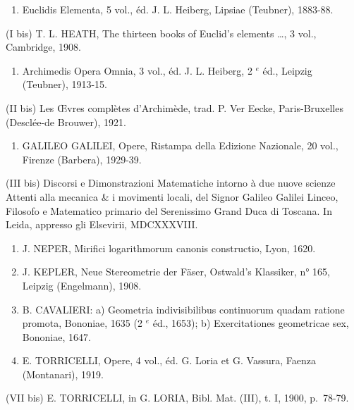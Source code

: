 \begin{enumerate}
\def\labelenumi{(\Roman{enumi})}
\tightlist
\item
  Euclidis Elementa, 5 vol., éd. J. L. Heiberg, Lipsiae (Teubner), 1883-88.
\end{enumerate}

(I bis) T. L. HEATH, The thirteen books of Euclid's elements \ldots, 3 vol., Cambridge, 1908.

\begin{enumerate}
\def\labelenumi{(\Roman{enumi})}
\setcounter{enumi}{1}
\tightlist
\item
  Archimedis Opera Omnia, 3 vol., éd. J. L. Heiberg, 2 \(^{e}\) éd., Leipzig (Teubner), 1913-15.
\end{enumerate}

(II bis) Les Œvres complètes d'Archimède, trad. P. Ver Eecke, Paris-Bruxelles (Desclée-de Brouwer), 1921.

\begin{enumerate}
\def\labelenumi{(\Roman{enumi})}
\setcounter{enumi}{2}
\tightlist
\item
  GALILEO GALILEI, Opere, Ristampa della Edizione Nazionale, 20 vol., Firenze (Barbera), 1929-39.
\end{enumerate}

(III bis) Discorsi e Dimonstrazioni Matematiche intorno à due nuove scienze Attenti alla mecanica \& i movimenti locali, del Signor Galileo Galilei Linceo, Filosofo e Matematico primario del Serenissimo Grand Duca di Toscana. In Leida, appresso gli Elsevirii, MDCXXXVIII.

\begin{enumerate}
\def\labelenumi{(\Roman{enumi})}
\setcounter{enumi}{3}
\item
  J. NEPER, Mirifici logarithmorum canonis constructio, Lyon, 1620.
\item
  J. KEPLER, Neue Stereometrie der Fäser, Ostwald's Klassiker, n° 165, Leipzig (Engelmann), 1908.
\item
  B. CAVALIERI: a) Geometria indivisibilibus continuorum quadam ratione promota, Bononiae, 1635 (2 \(^{e}\) éd., 1653); b) Exercitationes geometricae sex, Bononiae, 1647.
\item
  E. TORRICELLI, Opere, 4 vol., éd. G. Loria et G. Vassura, Faenza (Montanari), 1919.
\end{enumerate}

(VII bis) E. TORRICELLI, in G. LORIA, Bibl. Mat. (III), t. I, 1900, p.~78-79.

